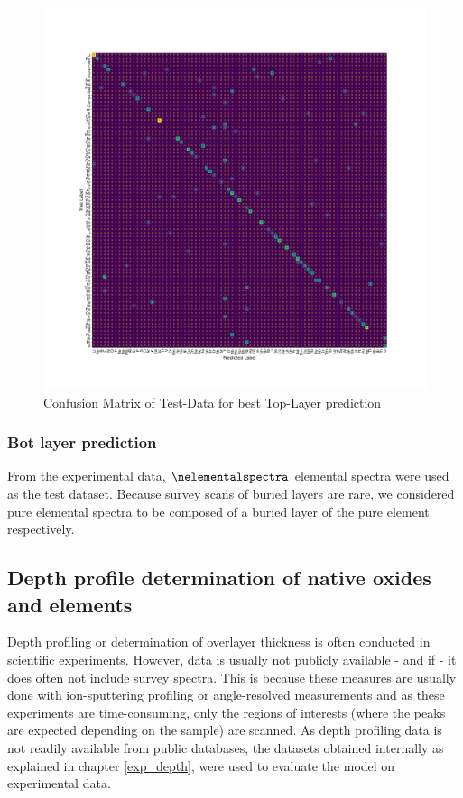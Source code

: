 \begin{center}
\begin{figure}[H]
        \centerline{\includegraphics[width=1.4\textwidth]{Figures/best_task_1_model_CM.png}}
    \centering
    \caption{Confusion Matrix of Test-Data for best Top-Layer prediction}
    \label{cm_cnn_1l}
\end{figure}
\end{center}



\subsubsection{Bot layer prediction}
From the experimental data, $\nelementalspectra$ elemental spectra were used as the test dataset. Because survey scans of buried layers are rare, we considered pure elemental spectra to be composed of a buried layer of the pure element respectively.

\subsection{Depth profile determination of native oxides and elements}
Depth profiling or determination of overlayer thickness is often conducted in scientific experiments. However, data is usually not publicly available - and if - it does often not include survey spectra. This is because these measures are usually done with ion-sputtering profiling or angle-resolved measurements and as these experiments are time-consuming, only the regions of interests (where the peaks are expected depending on the sample) are scanned.
As depth profiling data is not readily available from public databases, the datasets obtained internally as explained in chapter \ref{exp_depth}, were used to evaluate the model on experimental data.


